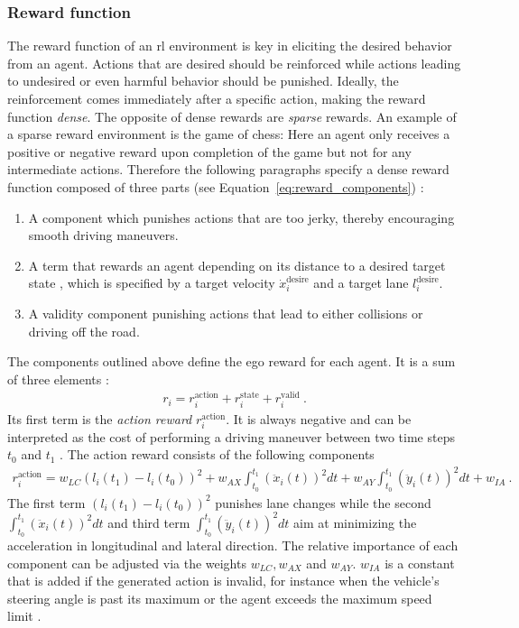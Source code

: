 \subsubsection{Reward function}\label{sssec:scenario_rewards}
The reward function of an \gls{rl} environment is key in eliciting the desired behavior from an agent. Actions that are desired should be reinforced while actions leading to undesired or even harmful behavior should be punished. Ideally, the reinforcement comes immediately after a specific action, making the reward function \emph{dense}. The opposite of dense rewards are \emph{sparse} rewards. An example of a sparse reward environment is the game of chess: Here an agent only receives a positive or negative reward upon completion of the game but not for any intermediate actions. Therefore the following paragraphs specify a dense reward function composed of three parts (see Equation~\ref{eq:reward_components}) \cite{kurzerDecentralizedCooperativePlanning2018}:
\begin{enumerate}
    \item A component which punishes actions that are too jerky, thereby encouraging smooth driving maneuvers.
    \item A term that rewards an agent depending on its distance to a desired target state , which is specified by a target velocity $\dot x_i^{\text{desire}}$ and a target lane $l_i^{\text{desire}}$.
    \item A validity component punishing actions that lead to either collisions or driving off the road.
\end{enumerate}
The components outlined above define the ego reward for each agent. It is a sum of three elements \cite{kurzerDecentralizedCooperativePlanning2018}:
\begin{gather}\label{eq:reward_components}
    r_i = r_i^{\text{action}} + r_i^{\text{state}} + r_i^{\text{valid}}~.
\end{gather}
Its first term is the \emph{action reward} $r_i^{\text{action}}$. It is always negative and can be interpreted as the cost of performing a driving maneuver between two time steps $t_0$ and $t_1$ \cite{kurzerDecentralizedCooperativePlanning2018}. The action reward consists of the following components
\begin{gather}\label{eq:reward_action}
    r_i^{\text{action}} = w_{LC} ( l_i (t_1) - l_i (t_0) )^2 + w_{AX} \int_{t_0}^{t_1} (\ddot x_i(t))^2 dt + w_{AY} \int_{t_0}^{t_1} (\ddot y_i(t))^2 dt + w_{IA}~.
\end{gather}
The first term $( l_i (t_1) - l_i (t_0) )^2$ punishes lane changes while the second $\int_{t_0}^{t_1} (\ddot x_i(t))^2 dt$ and third term $\int_{t_0}^{t_1} (\ddot y_i(t))^2 dt$ aim at minimizing the acceleration in longitudinal and lateral direction. The relative importance of each component can be adjusted via the weights $w_{LC}, w_{AX}$ and $w_{AY}$. $w_{IA}$ is a constant that is added if the generated action is invalid, for instance when the vehicle's steering angle is past its maximum or the agent exceeds the maximum speed limit \cite{kurzerDecentralizedCooperativePlanning2018}.

